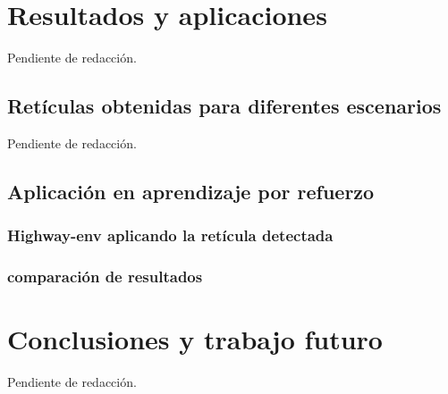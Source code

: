 \documentclass[10pt,letterpaper,final]{report}
\newlength{\spacing}
\newcommand{\nspace}[1]{\setlength{\baselineskip}{#1\spacing}}
\newenvironment{linespacing}[1]{\nspace{#1}}{}
\begin{document}
\begin{linespacing}{1.5}
\clearpage
\chapter{Resultados y aplicaciones}
Pendiente de redacción.
\section{Retículas obtenidas para diferentes escenarios}
Pendiente de redacción.

\section{Aplicación en aprendizaje por refuerzo}


\subsection{Highway-env aplicando la retícula detectada}


\subsection{comparación de resultados}

\clearpage
\chapter{Conclusiones y trabajo futuro}
Pendiente de redacción.

\end{linespacing}
\clearpage


\end{document}
